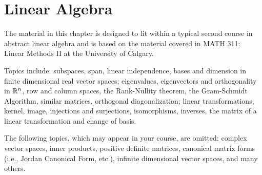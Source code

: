 \documentclass[12pt]{book}
\begin{document}
\chapter{Linear Algebra}\label{ch-lin}
The material in this chapter is designed to fit within a typical second course in abstract linear algebra and is based on the material covered in MATH 311: Linear Methods {\rm{II}} at the University of Calgary.

Topics include: subspaces, span, linear independence, bases and dimension in finite dimensional real vector spaces; eigenvalues, eigenvectors and orthogonality  in $\mathbb R^n$, row and column spaces, the Rank-Nullity theorem, the Gram-Schmidt Algorithm,  similar matrices,  orthogonal diagonalization; linear transformations, kernel, image, injections and surjections, isomorphisms, inverses, the matrix of a linear transformation and change of basis.

The following topics, which may appear in your course, are omitted: complex vector spaces, inner products, positive definite matrices, canonical matrix forms (i.e., Jordan Canonical Form, etc.), infinite dimensional vector spaces, and many others.












\end{document}
